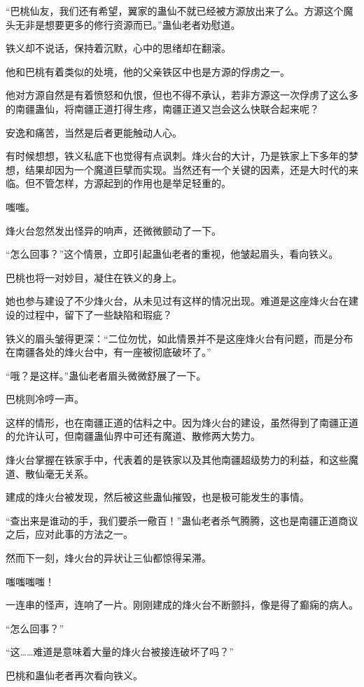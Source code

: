 \begin{this_body}
“巴桃仙友，我们还有希望，翼家的蛊仙不就已经被方源放出来了么。方源这个魔头无非是想要更多的修行资源而已。”蛊仙老者劝慰道。

铁义却不说话，保持着沉默，心中的思绪却在翻滚。

他和巴桃有着类似的处境，他的父亲铁区中也是方源的俘虏之一。

他对方源自然是有着愤怒和仇恨，但也不得不承认，若非方源这一次俘虏了这么多的南疆蛊仙，将南疆正道打得生疼，南疆正道又岂会这么快联合起来呢？

安逸和痛苦，当然是后者更能触动人心。

有时候想想，铁义私底下也觉得有点讽刺。烽火台的大计，乃是铁家上下多年的梦想，结果却因为一个魔道巨擘而实现。当然还有一个关键的因素，还是大时代的来临。但不管怎样，方源起到的作用也是举足轻重的。

嗤嗤。

烽火台忽然发出怪异的响声，还微微颤动了一下。

“怎么回事？”这个情景，立即引起蛊仙老者的重视，他皱起眉头，看向铁义。

巴桃也将一对妙目，凝住在铁义的身上。

她也参与建设了不少烽火台，从未见过有这样的情况出现。难道是这座烽火台在建设的过程中，留下了一些缺陷和瑕疵？

铁义的眉头皱得更深：“二位勿忧，如此情景并不是这座烽火台有问题，而是分布在南疆各处的烽火台中，有一座被彻底破坏了。”

“哦？是这样。”蛊仙老者眉头微微舒展了一下。

巴桃则冷哼一声。

这样的情形，也在南疆正道的估料之中。因为烽火台的建设，虽然得到了南疆正道的允许认可，但南疆蛊仙界中可还有魔道、散修两大势力。

烽火台掌握在铁家手中，代表着的是铁家以及其他南疆超级势力的利益，和这些魔道、散仙毫无关系。

建成的烽火台被发现，然后被这些蛊仙摧毁，也是极可能发生的事情。

“查出来是谁动的手，我们要杀一儆百！”蛊仙老者杀气腾腾，这也是南疆正道商议之后，应对此事的方法之一。

然而下一刻，烽火台的异状让三仙都惊得呆滞。

嗤嗤嗤嗤！

一连串的怪声，连响了一片。刚刚建成的烽火台不断颤抖，像是得了癫痫的病人。

“怎么回事？”

“这……难道是意味着大量的烽火台被接连破坏了吗？”

巴桃和蛊仙老者再次看向铁义。


\end{this_body}
